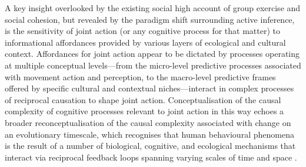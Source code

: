 \begin{CJK}{UTF8}{gbsn}
          A key insight overlooked by the existing social high account of group exercise and social cohesion, but revealed by the paradigm shift surrounding active inference, is the sensitivity of joint action (or any cognitive process for that matter) to informational affordances provided by various layers of ecological and cultural context.  Affordances for joint action appear to be dictated by processes operating at multiple conceptual levels---from the micro-level predictive processes associated with movement action and perception, to the macro-level predictive frames offered by specific cultural and contextual niches---interact in complex processes of reciprocal causation to shape joint action.  Conceptualisation of the causal complexity of cognitive processes relevant to joint action in this way echoes a broader reconceptualisation of the causal complexity associated with change on an evolutionary timescale, which recognises that human behavioural phenomena is the result of a number of biological, cognitive, and ecological mechanisms that interact via reciprocal feedback loops spanning varying scales of time and space \citep{Fuentes2015}.

























\end{CJK}
